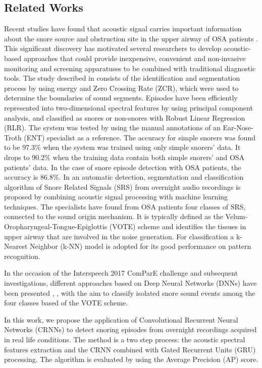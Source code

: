 \subsection{Related Works}
\label{ssec:related-works}
Recent studies have found that acoustic signal carries important information about the snore source and obstruction site in the upper airway of OSA patients \cite{pevernagie2010acoustics}. This significant discovery has motivated several researchers to develop acoustic-based approaches that could provide inexpensive, convenient and non-invasive monitoring and screening apparatuses to be combined with traditional diagnostic tools.
The study described in \cite{cavusoglu2007efficient} consists of the identification and segmentation process by using energy and Zero Crossing Rate (ZCR), which were used to determine the boundaries of sound segments. Episodes have been efficiently represented into two-dimensional spectral features by using principal component analysis, and classified as snores or non-snores with Robust Linear Regression (RLR). The system was tested by using the manual annotations of an Ear-Nose-Troth (ENT) specialist as a reference. The accuracy for simple snorers was found to be 97.3\% when the system was trained using only simple snorers' data. It drops to 90.2\% when the training data contain both simple snorers’ and OSA patients' data. In the case of snore episode detection with OSA patients, the accuracy is 86.8\%.
In \cite{qian2015automatic} an automatic detection, segmentation and classification algorithm of Snore Related Signals (SRS) from overnight audio recordings is proposed by combining acoustic signal processing with machine learning techniques.
The specialists have found from OSA patients four classes of SRS, connected to the sound origin mechanism. It is typically defined as the Velum-Oropharyngeal-Tongue-Epiglottis (VOTE) scheme and identifies the tissues in upper airway that are involved in the noise generation.
For classification a k-Nearest Neighbor (k-NN)  model is adopted for its good performance on pattern recognition.  

In the occasion of the Interspeech 2017 ComParE challenge \cite{ComParE2017} and subsequent investigations, different approaches based on Deep Neural Networks (DNNs) have been presented \cite{amiriparian2017snore}, \cite{freitag2017end}, \cite{vesperini2018snore} with the aim to classify isolated snore sound events among the four classes based of the VOTE scheme.

In this work, we propose the application of Convolutional Recurrent Neural Networks (CRNNs) to detect snoring episodes from overnight recordings acquired in real life conditions. The method is a two step process: the acoustic spectral features extraction and the CRNN combined with Gated Recurrent Units (GRU) processing. The algorithm is evaluated by using the Average Precision (AP) score.

